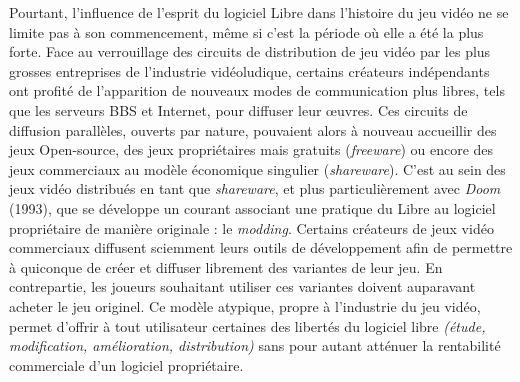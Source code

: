 \documentclass{FramateX}
\begin{document}
\begin{refsection}
Pourtant, l'influence de l'esprit du logiciel Libre dans l'histoire du
jeu vidéo ne se limite pas à son commencement, même si c'est la période
où elle a été la plus forte. Face au verrouillage des circuits de
distribution de jeu vidéo par les plus grosses entreprises de
l'industrie vidéoludique, certains créateurs indépendants ont profité
de l'apparition de nouveaux modes de communication plus libres, tels
que les serveurs BBS et Internet, pour diffuser leur œuvres. Ces
circuits de diffusion parallèles, ouverts par nature, pouvaient alors à
nouveau accueillir des jeux Open-source, des jeux propriétaires mais
gratuits (\textit{freeware}) ou encore des jeux commerciaux au modèle
économique singulier (\textit{shareware}). C'est au sein des jeux vidéo
distribués en tant que \textit{shareware}, et plus particulièrement
avec \textit{Doom} (1993), que se développe
un courant associant une pratique du Libre au logiciel propriétaire de
manière originale : le \textit{modding}.
Certains créateurs de jeux vidéo commerciaux diffusent sciemment leurs
outils de développement afin de permettre à quiconque de créer et
diffuser librement des variantes de leur jeu. En contrepartie, les
joueurs souhaitant utiliser ces variantes doivent auparavant acheter le
jeu originel. Ce modèle atypique, propre à l'industrie du jeu vidéo,
permet d'offrir à tout utilisateur certaines des libertés du logiciel
libre \textit{(étude, modification,
amélioration, distribution)} sans pour autant atténuer la rentabilité
commerciale d'un logiciel propriétaire.



\end{refsection}
\end{document}
